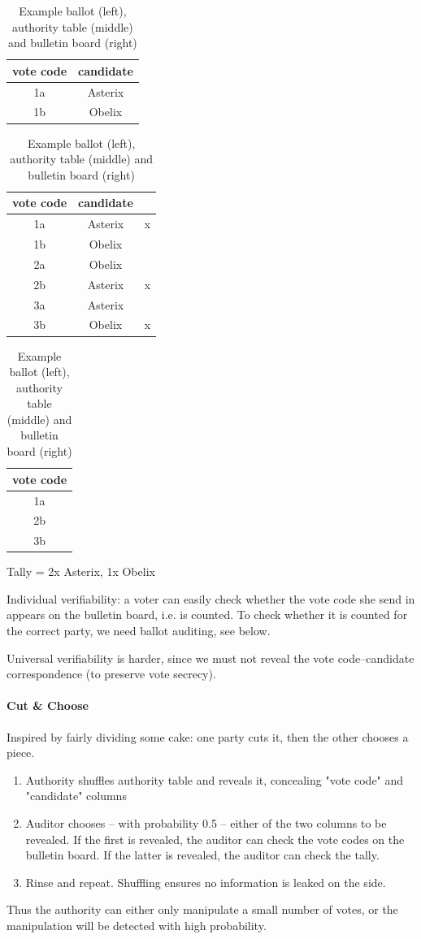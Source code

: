 \begin{table}[h]
\parbox{.3\linewidth}{ %
\centering
\begin{tabular}{|c|c|}
\hline
vote code & candidate \\
\hline
1a & Asterix \\
1b & Obelix \\
\hline
\end{tabular}
}
\parbox{.3\linewidth}{
\centering
\begin{tabular}{|c|c|c|}
\hline
vote code & candidate & \\
\hline
1a & Asterix & x \\
1b & Obelix & \\
2a & Obelix & \\
2b & Asterix & x \\
3a & Asterix & \\
3b & Obelix & x \\
\hline
\end{tabular}
}
%
\parbox{.4\linewidth}{ %
\centering
\begin{tabular}{|c|}
\hline
vote code \\
\hline
1a \\
2b \\
3b \\
\hline
\end{tabular}

Tally = 2x Asterix, 1x Obelix
}
\caption{Example ballot (left), authority table (middle) and bulletin board (right)}
\end{table}

Individual verifiability: a voter can easily check whether the vote code she send in appears on the bulletin board, i.e. is counted. To check whether it is counted for the correct party, we need ballot auditing, see below.

Universal verifiability is harder, since we must not reveal the vote code--candidate correspondence (to preserve vote secrecy).

\paragraph{Cut \& Choose} Inspired by fairly dividing some cake: one party cuts it, then the other chooses a piece.
\begin{enumerate}
    \item Authority shuffles authority table and reveals it, concealing "vote code" and "candidate" columns
    \item Auditor chooses -- with probability 0.5 -- either of the two columns to be revealed.
    If the first is revealed, the auditor can check the vote codes on the bulletin board. If the latter is revealed, the auditor can check the tally.
    \item Rinse and repeat. Shuffling ensures no information is leaked on the side.
\end{enumerate}
Thus the authority can either only manipulate a small number of votes, or the manipulation will be detected with high probability.

